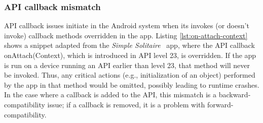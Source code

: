 \begin{figure}[t]%
    
\end{figure}

\begin{figure}%
    \lstset{language=Java}
     
\end{figure}


\subsubsection{API callback mismatch} \label{sec:callback-mismatch}

API callback issues initiate in the Android system when its invokes (or doesn't invoke) callback methods overridden in the app.  
Listing \ref{lst:on-attach-context} shows a snippet adapted from the \emph{Simple Solitaire}~\cite{simplesolitaire} app, where the API callback \textsf{onAttach(Context)}, which is introduced in API level 23, is overridden. 
If the app is run on a device running an API earlier than level 23, that method will never be invoked. 
Thus, any critical actions (e.g., initialization of an object) performed by the app in that method would be omitted, possibly leading to runtime crashes. 
In the case where a callback is added to the API, this mismatch is a backward-compatibility issue; if a callback is removed, it is a problem with forward-compatibility.

